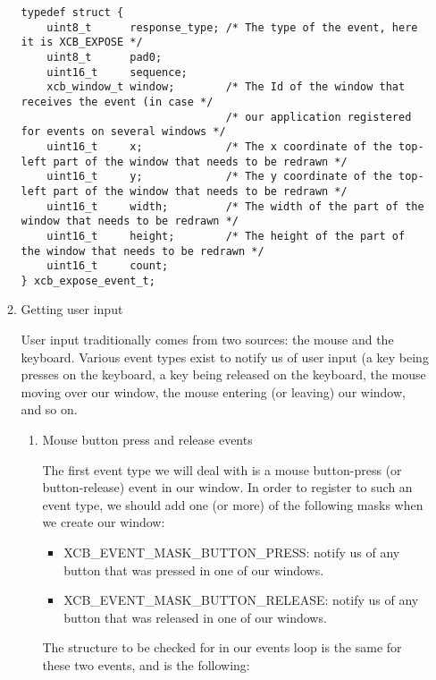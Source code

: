 \documentclass[12pt,oneside,titlepage]{book}
\providecommand{\tightlist}{%
  \setlength{\itemsep}{0pt}\setlength{\parskip}{0pt}}
\begin{document}
\begin{enumerate}
\begin{enumerate}
\begin{verbatim}
typedef struct {
    uint8_t      response_type; /* The type of the event, here it is XCB_EXPOSE */
    uint8_t      pad0;
    uint16_t     sequence;
    xcb_window_t window;        /* The Id of the window that receives the event (in case */
                                /* our application registered for events on several windows */
    uint16_t     x;             /* The x coordinate of the top-left part of the window that needs to be redrawn */
    uint16_t     y;             /* The y coordinate of the top-left part of the window that needs to be redrawn */
    uint16_t     width;         /* The width of the part of the window that needs to be redrawn */
    uint16_t     height;        /* The height of the part of the window that needs to be redrawn */
    uint16_t     count;
} xcb_expose_event_t;
\end{verbatim}
  \item
    \protect\hypertarget{userinput}{}{Getting user input}

    User input traditionally comes from two sources: the mouse and the
    keyboard. Various event types exist to notify us of user input (a
    key being presses on the keyboard, a key being released on the
    keyboard, the mouse moving over our window, the mouse entering (or
    leaving) our window, and so on.

    \begin{enumerate}
    \item
      \protect\hypertarget{mousepressrelease}{}{Mouse button press and
      release events}

      The first event type we will deal with is a mouse button-press (or
      button-release) event in our window. In order to register to such
      an event type, we should add one (or more) of the following masks
      when we create our window:

      \begin{itemize}
      \tightlist
      \item
        {XCB\_EVENT\_MASK\_BUTTON\_PRESS}: notify us of any button that
        was pressed in one of our windows.
      \item
        {XCB\_EVENT\_MASK\_BUTTON\_RELEASE}: notify us of any button
        that was released in one of our windows.
      \end{itemize}

      The structure to be checked for in our events loop is the same for
      these two events, and is the following:


\end{enumerate}
\end{enumerate}
\end{enumerate}
\end{document}

